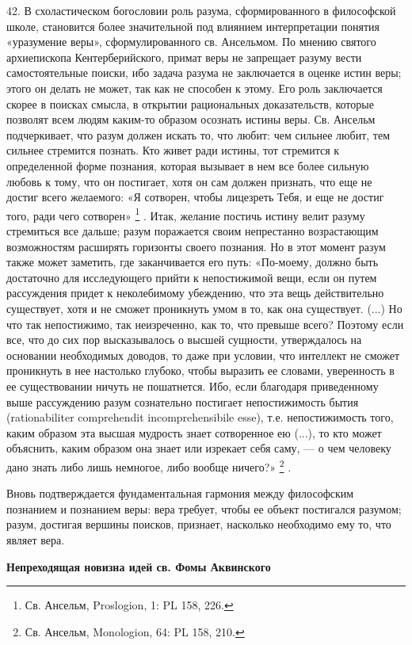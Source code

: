 \documentclass[a5paper,10pt]{article}
\begin{document}
42. В схоластическом богословии роль разума, сформированного в философской
школе, становится более значительной под влиянием интерпретации понятия
«уразумение веры», сформулированного св. Ансельмом. По мнению святого
архиепископа Кентерберийского, примат веры не запрещает разуму вести
самостоятельные поиски, ибо задача разума не заключается в оценке истин веры;
этого он делать не может, так как не способен к этому. Его роль заключается
скорее в поисках смысла, в открытии рациональных доказательств, которые
позволят всем людям каким-то образом осознать истины веры. Св. Ансельм
подчеркивает, что разум должен искать то, что любит: чем сильнее любит, тем
сильнее стремится познать. Кто живет ради истины, тот стремится к определенной
форме познания, которая вызывает в нем все более сильную любовь к тому, что он
постигает, хотя он сам должен признать, что еще не достиг всего желаемого: «Я
сотворен, чтобы лицезреть Тебя, и еще не достиг того, ради чего сотворен»
\footnote{Св. Ансельм, Proslogion, 1: PL 158, 226.}  .  Итак, желание постичь
истину велит разуму стремиться все дальше; разум поражается своим непрестанно
возрастающим возможностям расширять горизонты своего познания. Но в этот момент
разум также может заметить, где заканчивается его путь: «По-моему, должно быть
достаточно для исследующего прийти к непостижимой вещи, если он путем
рассуждения придет к неколебимому убеждению, что эта вещь действительно
существует, хотя и не сможет проникнуть умом в то, как она существует. (...) Но
что так непостижимо, так неизреченно, как то, что превыше всего? Поэтому если
все, что до сих пор высказывалось о высшей сущности, утверждалось на основании
необходимых доводов, то даже при условии, что интеллект не сможет проникнуть в
нее настолько глубоко, чтобы выразить ее словами, уверенность в ее
существовании ничуть не пошатнется. Ибо, если благодаря приведенному выше
рассуждению разум сознательно постигает непостижимость бытия (rationabiliter
comprehendit incomprehensibile esse), т.е. непостижимость того, каким образом
эта высшая мудрость знает сотворенное ею (...), то кто может объяснить, каким
образом она знает или изрекает себя саму, — о чем человеку дано знать либо лишь
немногое, либо вообще ничего?» \footnote{Св. Ансельм, Monologion, 64: PL 158,
210.} .

Вновь подтверждается фундаментальная гармония между философским познанием и
познанием веры: вера требует, чтобы ее объект постигался разумом; разум,
достигая вершины поисков, признает, насколько необходимо ему то, что являет
вера.

\textbf{Непреходящая новизна идей св. Фомы Аквинского}
\end{document}
